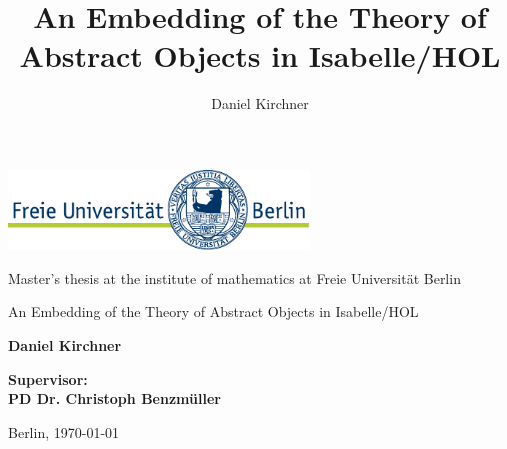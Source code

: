 \documentclass[a4paper,enabledeprecatedfontcommands]{scrreprt}
\title{An Embedding of the Theory of Abstract Objects in Isabelle/HOL}
\author{Daniel Kirchner}
\numberwithin{remark}{chapter}
\numberwithin{TODO}{chapter}
\begin{document}
\begin{titlepage}
\vspace{1cm}

\begin{center}
    \includegraphics[width=0.6\textwidth]{logo}
    \vspace{1cm}


Master's thesis at the institute of mathematics at Freie Universit\"at Berlin

    \vspace{2cm}


    \Large{\textsf{An Embedding of the Theory of Abstract Objects in Isabelle/HOL}}

    \vspace{2cm}

    \large{\textbf{Daniel Kirchner}}

    \vspace{2cm}

    \large{\textbf{
        Supervisor:\\
PD Dr. Christoph Benzm\"uller
    }}

    \vspace{2cm}
    \large{Berlin, \today}
\end{center}
\end{titlepage}
\end{document}
